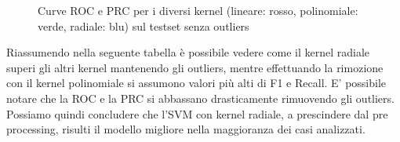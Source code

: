 \begin{figure}[H]
    \centering

    \quad

    \label{fig:roc_svm}
    \caption{Curve ROC e PRC per i diversi kernel (lineare: rosso, polinomiale: verde, radiale: blu) sul testset senza outliers}
\end{figure}

\newpage

\noindent
Riassumendo nella seguente tabella è possibile vedere come il kernel radiale superi gli altri kernel mantenendo gli outliers, mentre effettuando la rimozione con il kernel polinomiale si assumono valori più alti di F1 e Recall.
E' possibile notare che la ROC e la PRC si abbassano drasticamente rimuovendo gli outliers.
Possiamo quindi concludere che l'SVM con kernel radiale, a prescindere dal pre processing, risulti il modello migliore nella maggioranza dei casi analizzati.

